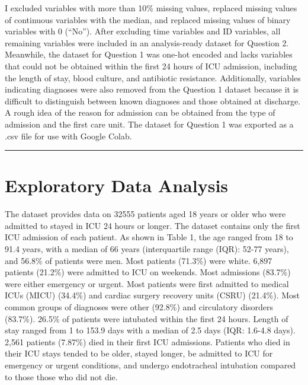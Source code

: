 \documentclass[
]{article}
\begin{document}
I excluded variables with more than 10\% missing values, replaced
missing values of continuous variables with the median, and replaced
missing values of binary variables with 0 (``No''). After excluding time
variables and ID variables, all remaining variables were included in an
analysis-ready dataset for Question 2. Meanwhile, the dataset for
Question 1 was one-hot encoded and lacks variables that could not be
obtained within the first 24 hours of ICU admission, including the
length of stay, blood culture, and antibiotic resistance. Additionally,
variables indicating diagnoses were also removed from the Question 1
dataset because it is difficult to distinguish between known diagnoses
and those obtained at discharge. A rough idea of the reason for
admission can be obtained from the type of admission and the first care
unit. The dataset for Question 1 was exported as a .csv file for use
with Google Colab.

\begin{center}\rule{0.5\linewidth}{0.5pt}\end{center}

\hypertarget{exploratory-data-analysis}{%
\section{Exploratory Data Analysis}\label{exploratory-data-analysis}}

The dataset provides data on 32555 patients aged 18 years or older who
were admitted to stayed in ICU 24 hours or longer. The dataset contains
only the first ICU admission of each patient. As shown in Table 1, the
age ranged from 18 to 91.4 years, with a median of 66 years
(interquartile range (IQR): 52-77 years), and 56.8\% of patients were
men. Most patients (71.3\%) were white. 6,897 patients (21.2\%) were
admitted to ICU on weekends. Most admissions (83.7\%) were either
emergency or urgent. Most patients were first admitted to medical ICUs
(MICU) (34.4\%) and cardiac surgery recovery units (CSRU) (21.4\%). Most
common groups of diagnoses were other (92.8\%) and circulatory disorders
(83.7\%). 26.5\% of patients were intubated within the first 24 hours.
Length of stay ranged from 1 to 153.9 days with a median of 2.5 days
(IQR: 1.6-4.8 days). 2,561 patients (7.87\%) died in their first ICU
admissions. Patients who died in their ICU stays tended to be older,
stayed longer, be admitted to ICU for emergency or urgent conditions,
and undergo endotracheal intubation compared to those those who did not
die.
\end{document}
